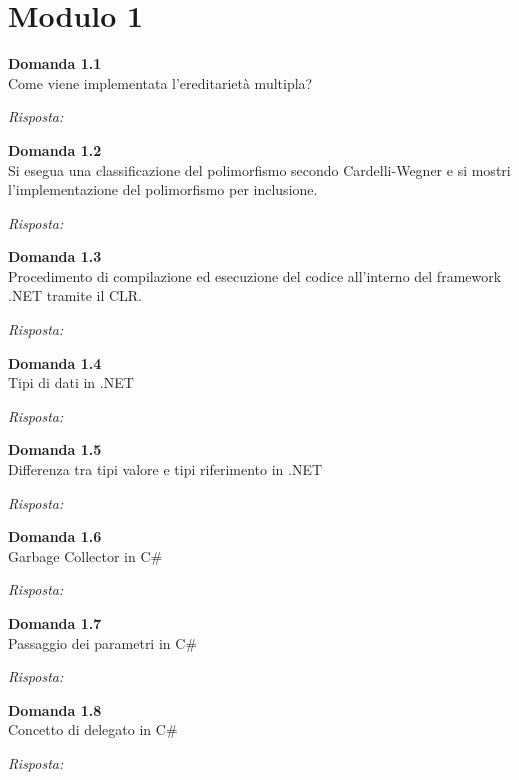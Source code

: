 \documentclass{article}
\newenvironment{problem}[2][Domanda]
    { \begin{mdframed}[backgroundcolor=gray!20] \textbf{#1 #2} \\}
    {  \end{mdframed}}
\newenvironment{solution}
    {\textit{Risposta:}}
    {}
\begin{document}
\section{Modulo 1}
\begin{problem}{1.1}
Come viene implementata l'ereditarietà multipla?
\end{problem}
\begin{solution}
\end{solution}
\begin{problem}{1.2}
Si esegua una classificazione del polimorfismo secondo Cardelli-Wegner e si mostri l'implementazione del polimorfismo per inclusione.
\end{problem}
\begin{solution}
\end{solution}
\begin{problem}{1.3}
Procedimento di compilazione ed esecuzione del codice all'interno del framework .NET tramite il CLR.
\end{problem}
\begin{solution}
\end{solution}

\begin{problem}{1.4}
Tipi di dati in .NET
\end{problem}
\begin{solution}
\end{solution}


\begin{problem}{1.5}
Differenza tra tipi valore e tipi riferimento in .NET
\end{problem}
\begin{solution}
\end{solution}


\begin{problem}{1.6}
Garbage Collector in C\#
\end{problem}
\begin{solution}
\end{solution}


\begin{problem}{1.7}
Passaggio dei parametri in C\#
\end{problem}
\begin{solution}
\end{solution}




\begin{problem}{1.8}
Concetto di delegato in C\#
\end{problem}
\begin{solution}
\end{solution}
\end{document}
